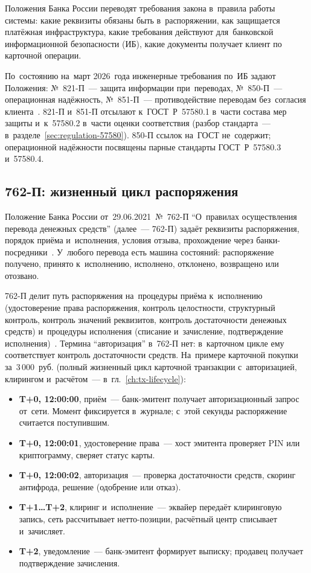 Положения Банка России переводят требования закона в~правила работы системы:
какие реквизиты обязаны быть в~распоряжении, как защищается платёжная
инфраструктура, какие требования действуют для~банковской информационной
безопасности (ИБ), какие документы получает клиент по карточной операции.

По~состоянию на~март 2026~года инженерные требования по~ИБ задают Положения:
№~821-П~--- защита информации при~переводах, №~850-П~--- операционная
надёжность, №~851-П~--- противодействие переводам без~согласия
клиента~\cite{cbr-821p,cbr-850p,cbr-851p}. 821-П и~851-П отсылают к~ГОСТ~Р~57580.1
в~части состава мер защиты и~к~57580.2 в~части оценки соответствия (разбор
стандарта~--- в~разделе~\ref{sec:regulation-57580}). 850-П ссылок на~ГОСТ
не~содержит; операционной надёжности посвящены парные стандарты ГОСТ~Р~57580.3
и~57580.4.

\subsection*{762-П: жизненный цикл распоряжения}

Положение Банка России от~29.06.2021~№~762-П \enquote{О~правилах осуществления
перевода денежных средств} (далее~--- 762-П) задаёт реквизиты распоряжения,
порядок приёма и~исполнения, условия отзыва, прохождение через
банки-посредники~\cite{cbr-762p}. У~любого перевода есть машина состояний:
распоряжение получено, принято к~исполнению, исполнено, отклонено, возвращено
или отозвано.

762-П делит путь распоряжения на~процедуры приёма к~исполнению
(удостоверение права распоряжения, контроль целостности, структурный контроль,
контроль значений реквизитов, контроль достаточности денежных средств)
и~процедуры исполнения (списание и~зачисление, подтверждение
исполнения)~\cite{cbr-762p}. Термина \enquote{авторизация} в~762-П нет:
в~карточном цикле ему соответствует контроль достаточности средств. На~примере
карточной покупки за~3\,000~руб. (полный жизненный цикл карточной транзакции
с~авторизацией, клирингом и~расчётом~--- в~гл.~\ref{ch:tx-lifecycle}):

\begin{itemize}
  \item \textbf{T+0, 12:00:00}, приём~--- банк-эмитент получает авторизационный
    запрос от~сети. Момент фиксируется в~журнале; с~этой секунды
    распоряжение считается поступившим.
  \item \textbf{T+0, 12:00:01}, удостоверение права~--- хост эмитента проверяет
    PIN или криптограмму, сверяет статус карты.
  \item \textbf{T+0, 12:00:02}, авторизация~--- проверка достаточности средств,
    скоринг антифрода, решение (одобрение или отказ).
  \item \textbf{T+1\ldots T+2}, клиринг и~исполнение~--- эквайер передаёт
    клиринговую запись, сеть рассчитывает нетто-позиции, расчётный центр
    списывает и~зачисляет.
  \item \textbf{T+2}, уведомление~--- банк-эмитент формирует выписку; продавец
    получает подтверждение зачисления.
\end{itemize}

